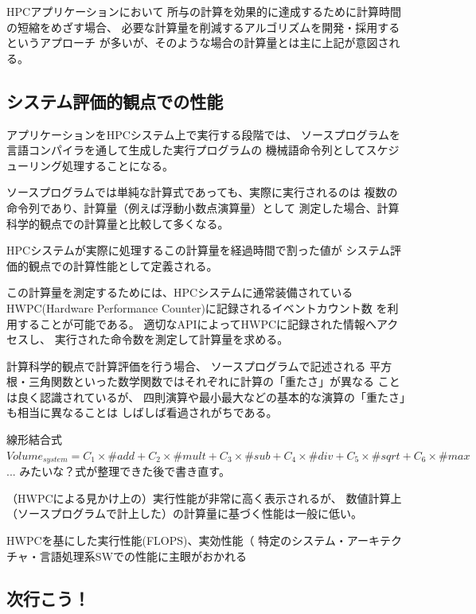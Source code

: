 \documentclass[submit,techrep,noauthor]{ipsj}
\begin{document}
HPCアプリケーションにおいて
所与の計算を効果的に達成するために計算時間の短縮をめざす場合、
必要な計算量を削減するアルゴリズムを開発・採用するというアプローチ
が多いが、そのような場合の計算量とは主に上記が意図される。


\subsection {システム評価的観点での性能}

アプリケーションをHPCシステム上で実行する段階では、
ソースプログラムを言語コンパイラを通して生成した実行プログラムの
機械語命令列としてスケジューリング処理することになる。

ソースプログラムでは単純な計算式であっても、実際に実行されるのは
複数の命令列であり、計算量（例えば浮動小数点演算量）として
測定した場合、計算科学的観点での計算量と比較して多くなる。

HPCシステムが実際に処理するこの計算量を経過時間で割った値が
システム評価的観点での計算性能として定義される。

この計算量を測定するためには、HPCシステムに通常装備されている
HWPC(Hardware Performance Counter)に記録されるイベントカウント数
を利用することが可能である。
適切なAPIによってHWPCに記録された情報へアクセスし、
実行された命令数を測定して計算量を求める。

計算科学的観点で計算評価を行う場合、
ソースプログラムで記述される
平方根・三角関数といった数学関数ではそれぞれに計算の「重たさ」が異なる
ことは良く認識されているが、
四則演算や最小最大などの基本的な演算の「重たさ」も相当に異なることは
しばしば看過されがちである。


{ \color{BLUE}
線形結合式\\
\begin{math}
Volume_{system} = C_{1}\times \#add + C_{2}\times \#mult + C_{3}\times \#sub + C_{4}\times \#div + C_{5}\times \#sqrt + C_{6}\times \#max
\end{math}\\
... みたいな？式が整理できた後で書き直す。\\
}


（HWPCによる見かけ上の）実行性能が非常に高く表示されるが、
数値計算上（ソースプログラムで計上した）の計算量に基づく性能は一般に低い。

HWPCを基にした実行性能(FLOPS)、実効性能（%
特定のシステム・アーキテクチャ・言語処理系SWでの性能に主眼がおかれる



\subsection {次行こう！}
\end{document}
